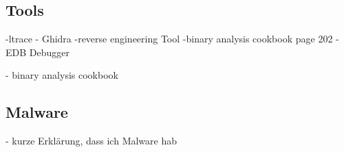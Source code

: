 \begin{otherlanguage}{ngerman}
\subsection{Tools}
-ltrace
\newline
- Ghidra
\newline
-reverse engineering Tool
\newline
-binary analysis cookbook page 202
\newline
- EDB Debugger




\newline 
- binary analysis cookbook  
\subsection{Malware}
- kurze Erklärung, dass ich Malware hab
\newpage
\end{otherlanguage}